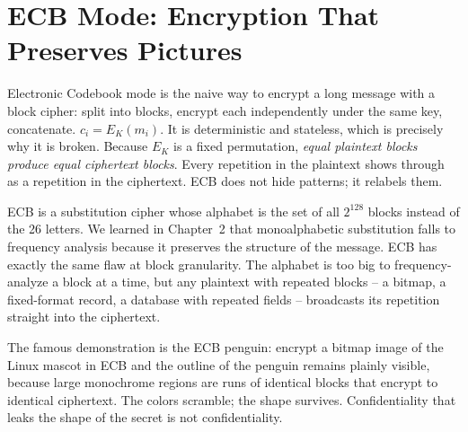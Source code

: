 \section{ECB Mode: Encryption That Preserves Pictures}
\label{ch38:ecb}

Electronic Codebook mode is the naive way to encrypt a long message with a block cipher: split into blocks, encrypt each independently under the same key, concatenate. $c_i = E_K(m_i)$. It is deterministic and stateless, which is precisely why it is broken. Because $E_K$ is a fixed permutation, \emph{equal plaintext blocks produce equal ciphertext blocks}. Every repetition in the plaintext shows through as a repetition in the ciphertext. ECB does not hide patterns; it relabels them.

\begin{intuitionbox}
ECB is a substitution cipher whose alphabet is the set of all $2^{128}$ blocks instead of the 26 letters. We learned in Chapter~2 that monoalphabetic substitution falls to frequency analysis because it preserves the structure of the message. ECB has exactly the same flaw at block granularity. The alphabet is too big to frequency-analyze a block at a time, but any plaintext with repeated blocks -- a bitmap, a fixed-format record, a database with repeated fields -- broadcasts its repetition straight into the ciphertext.
\end{intuitionbox}

The famous demonstration is the ECB penguin: encrypt a bitmap image of the Linux mascot in ECB and the outline of the penguin remains plainly visible, because large monochrome regions are runs of identical blocks that encrypt to identical ciphertext. The colors scramble; the shape survives. Confidentiality that leaks the shape of the secret is not confidentiality.

